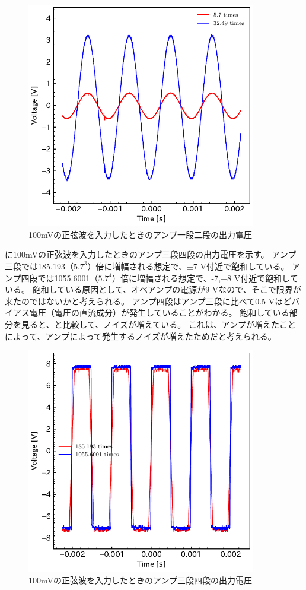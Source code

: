 \documentclass[report.tex]{subfiles}
\begin{document}
\begin{figure}[H]
	\centering
	\includegraphics[width=10cm]{fig/level12_100m.pdf}
	\caption{100mVの正弦波を入力したときのアンプ一段二段の出力電圧}
	\label{fig:12_100m}
\end{figure}

に100mVの正弦波を入力したときのアンプ三段四段の出力電圧を示す。
アンプ三段では185.193（\(5.7^3\)）倍に増幅される想定で、\(\pm\)7 V付近で飽和している。
アンプ四段では1055.6001（\(5.7^4\)）倍に増幅される想定で、-7,+8 V付近で飽和している。
飽和している原因として、オペアンプの電源が9 Vなので、そこで限界が来たのではないかと考えられる。
アンプ四段はアンプ三段に比べて0.5 Vほどバイアス電圧（電圧の直流成分）が発生していることがわかる。
飽和している部分を見ると、と比較して、ノイズが増えている。
これは、アンプが増えたことによって、アンプによって発生するノイズが増えたためだと考えられる。

\begin{figure}[H]
	\centering
	\includegraphics[width=10cm]{fig/level34_100m.pdf}
	\caption{100mVの正弦波を入力したときのアンプ三段四段の出力電圧}
	\label{fig:34_100m}
\end{figure}
\end{document}
